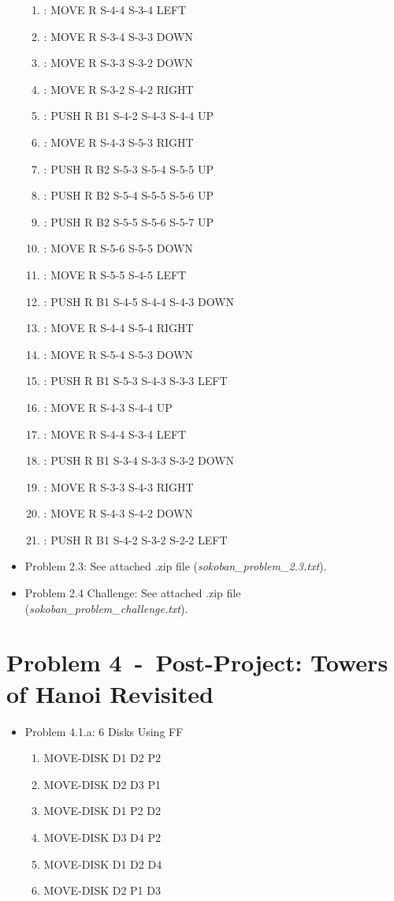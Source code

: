 \documentclass[12pt]{article}
\newcommand{\problem}[2]{\section*{Problem {#1}~-~{#2}}}
\begin{document}
\begin{appendix}
\begin{itemize}
\begin{enumerate}
	\item: MOVE R S-4-4 S-3-4 LEFT
	\item: MOVE R S-3-4 S-3-3 DOWN
	\item: MOVE R S-3-3 S-3-2 DOWN
	\item: MOVE R S-3-2 S-4-2 RIGHT
	\item: PUSH R B1 S-4-2 S-4-3 S-4-4 UP
	\item: MOVE R S-4-3 S-5-3 RIGHT
	\item: PUSH R B2 S-5-3 S-5-4 S-5-5 UP
	\item: PUSH R B2 S-5-4 S-5-5 S-5-6 UP
	\item: PUSH R B2 S-5-5 S-5-6 S-5-7 UP
	\item: MOVE R S-5-6 S-5-5 DOWN
	\item: MOVE R S-5-5 S-4-5 LEFT
	\item: PUSH R B1 S-4-5 S-4-4 S-4-3 DOWN
	\item: MOVE R S-4-4 S-5-4 RIGHT
	\item: MOVE R S-5-4 S-5-3 DOWN
	\item: PUSH R B1 S-5-3 S-4-3 S-3-3 LEFT
	\item: MOVE R S-4-3 S-4-4 UP
	\item: MOVE R S-4-4 S-3-4 LEFT
	\item: PUSH R B1 S-3-4 S-3-3 S-3-2 DOWN
	\item: MOVE R S-3-3 S-4-3 RIGHT
	\item: MOVE R S-4-3 S-4-2 DOWN
	\item: PUSH R B1 S-4-2 S-3-2 S-2-2 LEFT
      \end{enumerate}
    \item Problem 2.3: See attached .zip file (\textit{sokoban\_problem\_2.3.txt}).
    \item Problem 2.4 Challenge: See attached .zip file (\textit{sokoban\_problem\_challenge.txt}).
  \end{itemize}
\problem{4}{Post-Project: Towers of Hanoi Revisited}
  \begin{itemize}
    \item Problem 4.1.a: 6 Disks Using FF
	\begin{enumerate}
	\item  MOVE-DISK D1 D2 P2
	\item  MOVE-DISK D2 D3 P1
	\item  MOVE-DISK D1 P2 D2
	\item  MOVE-DISK D3 D4 P2
	\item  MOVE-DISK D1 D2 D4
	\item  MOVE-DISK D2 P1 D3

\end{enumerate}
\end{itemize}
\end{appendix}
\end{document}
